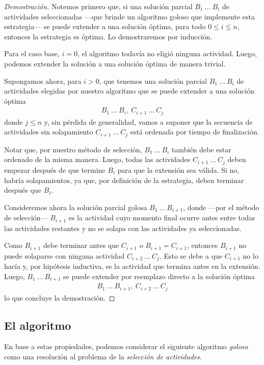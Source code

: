 \begin{proof}[Demostración]
    Notemos primero que, si una solución parcial $B_1\ ...\ B_i$ de actividades seleccionadas ---que brinde un algoritmo goloso que implemente esta estrategia--- se puede extender a una solución óptima, para todo $0 \leq i \leq n$, entonces la estrategia es óptima. Lo demostraremos por inducción.

    Para el caso base, $i = 0$, el algoritmo todavía no eligió ninguna actividad. Luego, podemos extender la solución a una solución óptima de manera trivial.

    Supongamos ahora, para $i > 0$, que tenemos una solución parcial $B_1\ ...\ B_i$ de actividades elegidas por nuestro algoritmo que se puede extender a una solución óptima
    \begin{align}\nonumber
        B_1\ ...\ B_i,\ C_{i+1}\ ...\ C_j
    \end{align}
    donde $j \leq n$ y, sin pérdida de generalidad, vamos a suponer que la secuencia de actividades sin solapamiento $C_{i+1}\ ...\ C_j$ está ordenada por tiempo de finalización. 

    Notar que, por nuestro método de selección, $B_1\ ...\ B_i$ también debe estar ordenado de la misma manera. Luego, todas las actividades $C_{i+1}\ ...\ C_j$ deben empezar después de que termine $B_i$ para que la extensión sea válida. Si no, habría solapamientos, ya que, por definición de la estrategia, deben terminar después que $B_i$.

    Consideremos ahora la solución parcial golosa $B_1\ ...\ B_{i+1}$, donde ---por el método de selección--- $B_{i+1}$ es la actividad cuyo momento final ocurre antes entre todas las actividades restantes y no se solapa con las actividades ya seleccionadas. 

    Como $B_{i+1}$ debe terminar antes que $C_{i+1}$ o $B_{i+1} = C_{i+1}$, entonces $B_{i+1}$ no puede solaparse con ninguna actividad $C_{i+2}\ ...\ C_j$. Esto se debe a que $C_{i+1}$ no lo hacía y, por hipótesis inductiva, es la actividad que termina antes en la extensión. Luego, $B_1\ ...\ B_{i+1}$ se puede extender por reemplazo directo a la solución óptima 
    \begin{align}\nonumber
        B_1\ ...\ B_{i+1},\ C_{i+2}\ ...\ C_j
    \end{align}
    lo que concluye la demostración.
\end{proof}

\subsection{El algoritmo} En base a estas propiedades, podemos considerar el siguiente algoritmo \textit{goloso} como una resolución al problema de la \textit{selección de actividades}. 

